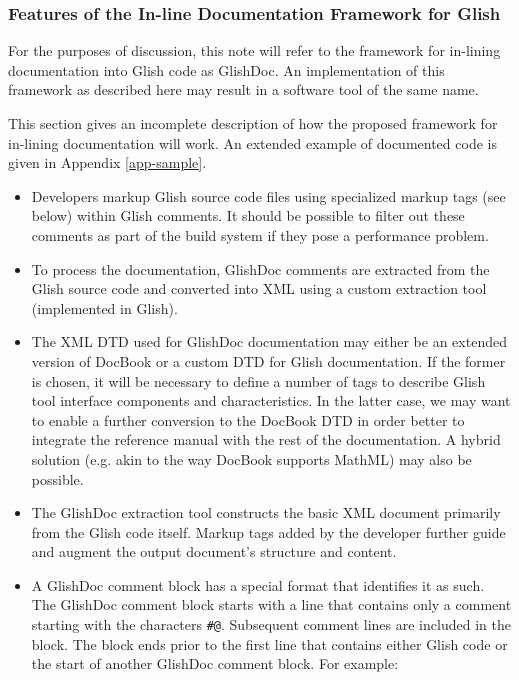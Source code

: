 \subsubsection{Features of the In-line Documentation Framework for
Glish}
\label{gdxml}

For the purposes of discussion, this note will refer to the framework
for in-lining documentation into Glish code as GlishDoc.  An
implementation of this framework as described here may result in a
software tool of the same name.

This section gives an incomplete description of how the proposed
framework for in-lining documentation will work.  An extended example
of documented code is given in Appendix \ref{app-sample}.

\begin{itemize}

\item Developers markup Glish source code files using specialized
markup tags (see below) within Glish comments.  It should be possible
to filter out these comments as part of the \aipspp build system if
they pose a performance problem.  

\item To process the documentation, GlishDoc comments are extracted
from the Glish source code and converted into XML using a custom
extraction tool (implemented in Glish).  

\item \label{pg-gdxml} The XML DTD used for GlishDoc documentation may
either be an extended version of DocBook or a custom DTD for Glish
documentation.  If the former is chosen, it will be necessary to
define a number of tags to describe Glish tool interface components
and characteristics.  In the latter case, we may want to enable a
further conversion to the DocBook DTD in order better to integrate the
reference manual with the rest of the documentation.  A hybrid
solution (e.g. akin to the way DocBook supports MathML) may also be
possible.

\item The GlishDoc extraction tool constructs the basic XML document
primarily from the Glish code itself.  Markup tags added by the
developer further guide and augment the output document's structure and
content.  

\item A GlishDoc comment block has a special format that identifies it
as such.  The GlishDoc comment block starts with a line that contains
only a comment starting with the characters \verb|#@|.  Subsequent
comment lines are included in the block.  The block ends prior to the
first line that contains either Glish code or the start of another
GlishDoc comment block.  For example:


\end{itemize}

